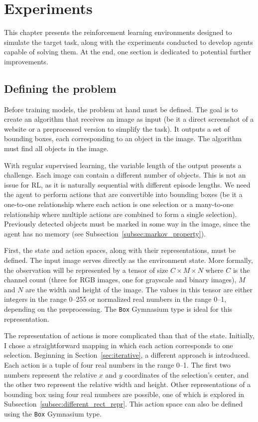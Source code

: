 \documentclass[
  digital,     %
  oneside,     %
  nosansbold,  %
  nocolorbold, %
  lof,         %
  lot,         %
]{fithesis4}
\begin{document}
\chapter{Experiments}
\label{ch:experiments}

This chapter presents the reinforcement learning environments designed to simulate the target task, along with the experiments conducted to develop agents capable of solving them. At the end, one section is dedicated to potential further improvements.

\section{Defining the problem}
\label{sec:problem_definition}

Before training models, the problem at hand must be defined. The goal is to create an algorithm that receives an image as input (be it a direct screenshot of a website or a preprocessed version to simplify the task). It outputs a set of bounding boxes, each corresponding to an object in the image. The algorithm must find all objects in the image.

With regular supervised learning, the variable length of the output presents a challenge. Each image can contain a different number of objects. This is not an issue for RL, as it is naturally sequential with different episode lengths. We need the agent to perform actions that are convertible into bounding boxes (be it a one-to-one relationship where each action is one selection or a many-to-one relationship where multiple actions are combined to form a single selection). Previously detected objects must be marked in some way in the image, since the agent has no memory (see Subsection~\ref{subsec:markov_property}).

First, the state and action spaces, along with their representations, must be defined. The input image serves directly as the environment state. More formally, the observation will be represented by a tensor of size $C\times M \times N$ where $C$ is the channel count (three for RGB images, one for grayscale and binary images), $M$ and $N$ are the width and height of the image. The values in this tensor are either integers in the range 0--255 or normalized real numbers in the range 0--1, depending on the preprocessing. The \texttt{Box} Gymnasium type is ideal for this representation.

The representation of actions is more complicated than that of the state. Initially, I chose a straightforward mapping in which each action corresponds to one selection. Beginning in Section~\ref{sec:iterative}, a different approach is introduced. Each action is a tuple of four real numbers in the range 0--1. The first two numbers represent the relative $x$ and $y$ coordinates of the selection's center, and the other two represent the relative width and height. Other representations of a bounding box using four real numbers are possible, one of which is explored in Subsection~\ref{subsec:different_rect_repr}. This action space can also be defined using the \texttt{Box} Gymnasium type.
\end{document}
